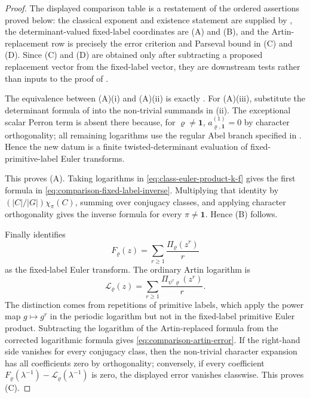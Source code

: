 \documentclass[11pt,a4paper]{amsart}
\theoremstyle{plain}
\theoremstyle{definition}
\theoremstyle{remark}
\begin{document}
\begin{proof}
  The displayed comparison table is a restatement of the ordered assertions
  proved below: the classical exponent and existence statement are supplied by
  , the determinant-valued fixed-label
  coordinates are \textup{(A)} and \textup{(B)}, and the Artin-replacement row
  is precisely the error criterion and Parseval bound in \textup{(C)} and
  \textup{(D)}.  Since \textup{(C)} and \textup{(D)} are obtained only after
  subtracting a proposed replacement vector from the fixed-label vector, they
  are downstream tests rather than inputs to the proof of
  .

  The equivalence between \textup{(A)(i)} and \textup{(A)(ii)} is exactly
  . For \textup{(A)(iii)}, substitute the
  determinant formula of  into
  the non-trivial summands in (ii). The exceptional scalar Perron term is
  absent there because, for \(\varrho\neq\mathbf1\),
  \(a_{\varrho,\mathbf1}^{(1)}=0\) by character orthogonality; all
  remaining logarithms use the regular Abel branch specified in
  . Hence the new datum is a
  finite twisted-determinant evaluation of fixed-primitive-label Euler
  transforms.

  This proves \textup{(A)}.  Taking logarithms in
  \eqref{eq:class-euler-product-k-f} gives the first formula in
  \eqref{eq:comparison-fixed-label-inverse}. Multiplying that identity by
  \((|C|/|G|)\chi_\pi(C)\), summing over conjugacy classes, and applying
  character orthogonality gives the inverse formula for every
  \(\pi\ne\mathbf1\).  Hence \textup{(B)} follows.

  Finally  identifies
  \[
    F_\varrho(z)=\sum_{r\ge1}\frac{\Pi_\varrho(z^r)}{r}
  \]
  as the fixed-label Euler transform.  The ordinary Artin logarithm is
  \[
    \mathcal L_\varrho(z)=
    \sum_{r\ge1}\frac{\Pi_{\psi^r\varrho}(z^r)}{r}.
  \]
  The distinction comes from
  repetitions of primitive labels, which apply the power map
  \(g\mapsto g^r\) in the periodic logarithm but not in the fixed-label
  primitive Euler product. Subtracting the logarithm of the Artin-replaced
  formula from the corrected logarithmic formula gives
  \eqref{eq:comparison-artin-error}.  If the right-hand side vanishes for
  every conjugacy class, then the non-trivial character expansion has all
  coefficients zero by orthogonality; conversely, if every coefficient
  \(F_\varrho(\lambda^{-1})-
  \mathcal L_\varrho(\lambda^{-1})\) is zero, the displayed error vanishes
  classwise.  This proves \textup{(C)}.


\end{proof}
\end{document}
